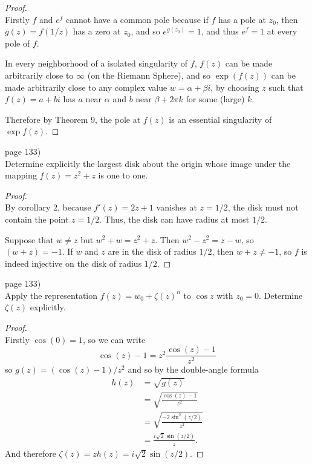 \documentclass{article}
\newenvironment{problem}[2][Problem]{\begin{trivlist}
\item[\hskip \labelsep {\bfseries #1}\hskip \labelsep {\bfseries #2.}]}{\end{trivlist}}
\begin{document}
\begin{proof} \text{} \\
  Firstly $f$ and $e^f$ cannot have a common pole because if $f$ has a pole at
  $z_0$, then $g(z) = f(1/z)$ has a zero at $z_0$, and so $e^{g(z_0)} = 1$, and
  thus $e^f = 1$ at every pole of $f$.

  In every neighborhood of a isolated singularity of $f$, $f(z)$ can be made
  arbitrarily close to $\infty$ (on the Riemann Sphere), and so $\exp(f(z))$ can
  be made arbitrarily close to any complex value $w = \alpha + \beta i$,
  by choosing $z$ such that $f(z) = a + bi$ has $a$ near $\alpha$ and $b$ near
  $\beta + 2\pi k$ for some (large) $k$.

  Therefore by Theorem 9, the pole at $f(z)$ is an essential singularity of
  $\exp f(z)$.
\end{proof}
\pagebreak

\begin{problem}{1} (page 133) \\
  Determine explicitly the largest disk about the origin whose image under the
  mapping $f(z) = z^2 + z$ is one to one.
\end{problem}

\begin{proof} \text{} \\
  By corollary 2, because $f'(z) = 2z + 1$ vanishes at
  $z = 1/2$, the disk must not contain the point $z = 1/2$. Thus, the disk can
  have radius at most $1/2$.

  Suppose that $w \not= z$ but $w^2 + w = z^2 + z$. Then $w^2 - z^2 = z - w$, so
  $(w + z) = -1$. If $w$ and $z$ are in the disk of radius $1/2$, then
  $w + z \not= -1$, so $f$ is indeed injective on the disk of radius $1/2$.
\end{proof}
\pagebreak

\begin{problem}{3} (page 133) \\
  Apply the representation $f(z) = w_0 + \zeta(z)^n$ to $\cos z$ with $z_0 = 0$.
  Determine $\zeta(z)$ explicitly.
\end{problem}

\begin{proof} \text{} \\
  Firstly $\cos(0) = 1$, so we can write \[
    \cos(z) - 1 = z^2\frac{\cos(z) - 1}{z^2}
  \] so $g(z) = (\cos(z) - 1)/z^2$ and so by the double-angle formula \begin{align*}
    h(z) &= \sqrt{g(z)}\\
    &= \sqrt{\frac{\cos(z) - 1}{z^2}}\\
    &= \sqrt{\frac{-2\sin^2(z/2)}{z^2}}\\
    &= \frac{i\sqrt{2}\sin(z/2)}{z}.
  \end{align*}
  And therefore $\zeta(z) = zh(z) = i\sqrt{2}\sin(z/2)$.
\end{proof}
\end{document}
